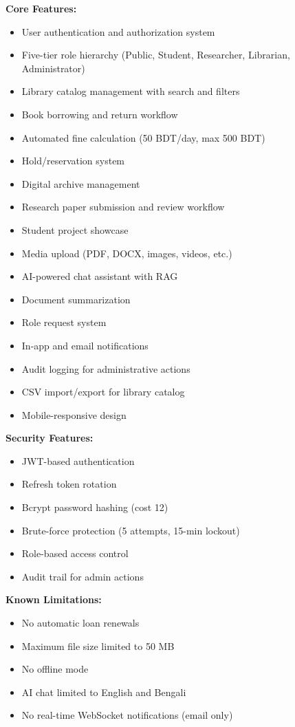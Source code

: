 \documentclass[12pt,a4paper]{article}
\begin{document}
\textbf{Core Features:}
\begin{itemize}[leftmargin=*]
    \item User authentication and authorization system
    \item Five-tier role hierarchy (Public, Student, Researcher, Librarian, Administrator)
    \item Library catalog management with search and filters
    \item Book borrowing and return workflow
    \item Automated fine calculation (50 BDT/day, max 500 BDT)
    \item Hold/reservation system
    \item Digital archive management
    \item Research paper submission and review workflow
    \item Student project showcase
    \item Media upload (PDF, DOCX, images, videos, etc.)
    \item AI-powered chat assistant with RAG
    \item Document summarization
    \item Role request system
    \item In-app and email notifications
    \item Audit logging for administrative actions
    \item CSV import/export for library catalog
    \item Mobile-responsive design
\end{itemize}

\textbf{Security Features:}
\begin{itemize}[leftmargin=*]
    \item JWT-based authentication
    \item Refresh token rotation
    \item Bcrypt password hashing (cost 12)
    \item Brute-force protection (5 attempts, 15-min lockout)
    \item Role-based access control
    \item Audit trail for admin actions
\end{itemize}

\textbf{Known Limitations:}
\begin{itemize}[leftmargin=*]
    \item No automatic loan renewals
    \item Maximum file size limited to 50 MB
    \item No offline mode
    \item AI chat limited to English and Bengali
    \item No real-time WebSocket notifications (email only)
\end{itemize}
\end{document}
